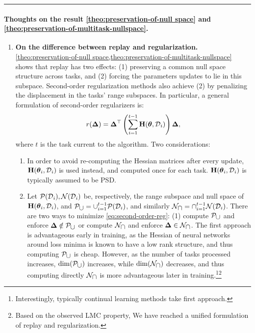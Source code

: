 \documentclass{article} %
\newcommand{\hessian}{\vH}
\newcommand{\lighthline}{\noindent\textcolor{gray!50}{\rule{\linewidth}{0.4pt}}}
\begin{document}
\lighthline

\paragraph{Thoughts on the result \cref{theo:preservation-of-null space} and \cref{theo:preservation-of-multitask-nullspace}.} 
\begin{enumerate}
    \item \textbf{On the difference between replay and regularization.}  \cref{theo:preservation-of-null space,theo:preservation-of-multitask-nullspace} shows that replay has two effects: (1) preserving a common null space structure across tasks, and (2) forcing the parameters updates to lie in this subspace. Second-order regularization methods also achieve (2) by penalizing the displacement in the tasks' range subspaces. In particular, a general formulation of second-order regularizers is: 
    \begin{equation}
    \label{eq:second-order-reg}
        \reg(\vDelta) = \vDelta^\top\rnd{\sum_{i=1}^{t-1}\hessian(\vparam, \data_i)}\vDelta, 
    \end{equation}
    where $t$ is the task current to the algorithm. Two considerations: 
    \begin{enumerate}
        \item In order to avoid re-computing the Hessian matrices after every update, $\hessian(\vparam_i, \data_i)$ is used instead, and computed once for each task. $\hessian(\vparam_i, \data_i)$ is typically assumed to be PSD. 
        \item Let $\mathcal{P}(\mbox{${\cal D}$}_i), \mathcal{N}(\mbox{${\cal D}$}_i)$ be, respectively, the range subspace and null space of $\hessian(\vparam_i, \data_i)$, and $\mathcal{P}_{\mbox{$\cup$}} = \mbox{$\cup$}_{i=1}^{t-1} \mathcal{P}(\mbox{${\cal D}$}_i)$, and similarly $\mathcal{N}_{\mbox{$\cap$}} = \mbox{$\cap$}_{i=1}^{t-1} \mathcal{N}(\mbox{${\cal D}$}_i)$. There are two ways to minimize \cref{eq:second-order-reg}: (1) compute $\mathcal{P}_{\mbox{$\cup$}}$ and enforce $\mbox{$\mbox{$\boldsymbol{\Delta}$}$} \notin  \mathcal{P}_{\mbox{$\cup$}}$ or compute $\mathcal{N}_{\mbox{$\cap$}}$ and enforce $\mbox{$\mbox{$\boldsymbol{\Delta}$}$} \in \mathcal{N}_{\mbox{$\cap$}}$. 
        The first approach is advantageous early in training, as the Hessian of neural networks around loss minima is known to have a low rank structure, and thus computing $\mathcal{P}_{\mbox{$\cup$}}$ is cheap. However, as the number of tasks processed increases, $\dim(\mathcal{P}_{\mbox{$\cup$}})$ increases, while $\dim(\mathcal{N}_{\mbox{$\cap$}})$ decreases, and thus computing directly $\mathcal{N}_{\mbox{$\cap$}}$ is more advantageous later in training.\footnote{Interestingly, typically continual learning methods take first approach.}\footnote{Based on the observed LMC property, We have reached a unified formulation of replay and regularization.} 

\end{enumerate}
\end{enumerate}
\end{document}
